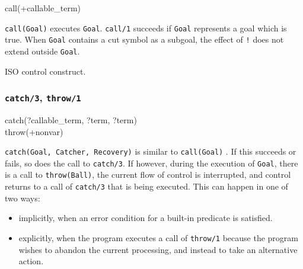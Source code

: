 \begin{TemplatesOneCol}
call(+callable\_term)

\end{TemplatesOneCol}

\Description

\texttt{call(Goal)} executes \texttt{Goal}. \texttt{call/1} succeeds if
\texttt{Goal} represents a goal which is true. When \texttt{Goal} contains a
cut symbol \IdxCC["!/0]{!}  as a subgoal, the effect of
\texttt{!} does not extend outside \texttt{Goal}. 

\begin{PlErrors}




\end{PlErrors}

\Portability

ISO control construct.

\subsubsection{\texttt{catch/3},
               \texttt{throw/1}}
\label{catch/3}

\begin{TemplatesOneCol}
catch(?callable\_term, ?term, ?term)\\
throw(+nonvar)

\end{TemplatesOneCol}

\Description

\texttt{catch(Goal, Catcher, Recovery)} is similar to \texttt{call(Goal)}
. If this succeeds or fails, so does the call to
\texttt{catch/3}. If however, during the execution of \texttt{Goal}, there
is a call to \texttt{throw(Ball)}, the current flow of control is
interrupted, and control returns to a call of \texttt{catch/3} that is being
executed. This can happen in one of two ways: 

\begin{itemize}

\item implicitly, when an error condition for a built-in predicate is
satisfied.

\item explicitly, when the program executes a call of \texttt{throw/1}
because the program wishes to abandon the current processing, and instead to
take an alternative action.

\end{itemize}

